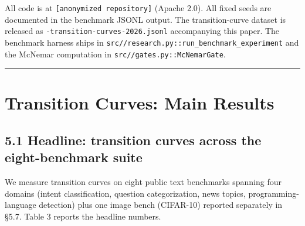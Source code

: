 All code is at \texttt{{[}anonymized\ repository{]}} (Apache 2.0). All
fixed seeds are documented in the benchmark JSONL output. The
transition-curve dataset is released as
\texttt{\pkgname{}-transition-curves-2026.jsonl} accompanying this paper.
The benchmark harness ships in
\texttt{src/\pkgname{}/research.py::run\_benchmark\_experiment} and the
McNemar computation in \texttt{src/\pkgname{}/gates.py::McNemarGate}.

\begin{center}\rule{0.5\linewidth}{0.5pt}\end{center}

\section{Transition Curves: Main
Results}\label{transition-curves-main-results}

\subsection{5.1 Headline: transition curves across the eight-benchmark
suite}\label{headline-transition-curves-across-the-eight-benchmark-suite}

We measure transition curves on eight public text benchmarks spanning
four domains (intent classification, question categorization, news
topics, programming-language detection) plus one image bench (CIFAR-10)
reported separately in §5.7. Table 3 reports the headline numbers.

